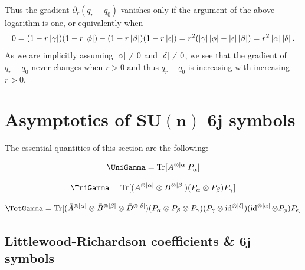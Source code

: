 \documentclass[notitlepage, 10pt]{article}
\begin{document}
Thus the gradient $\partial_{r} (q_{r}-q_{0})$ vanishes only if the argument of the above logarithm is one, or equivalently when
\begin{equation}
    0 = (1-r\left|\gamma\right|)(1-r\left|\phi\right|)-(1-r\left|\beta\right|)(1-r\left|\epsilon\right|) = r^2(\left|\gamma\right|\left|\phi\right| - \left|\epsilon\right|\left|\beta\right|) = r^2 \left|\alpha\right|\left|\delta\right|.
\end{equation}
As we are implicitly assuming $\left|\alpha\right| \neq 0$ and $\left|\delta\right| \neq 0$, we see that the gradient of $q_{r} - q_{0}$ never changes when $r>0$ and thus $q_{r}-q_{0}$ is increasing with increasing $r > 0$.


\clearpage
\section{Asymptotics of \texorpdfstring{$\boldsymbol{SU(n)}$ $\boldsymbol{6j}$}{SU(n) 6j} symbols}

The essential quantities of this section are the following:

\begin{equation}
    \UniGamma
    = \Tr[\bar A^{\ot \abs \alpha} P_{\alpha}]
\end{equation}

\begin{equation}
    \TriGamma 
    = \Tr[(\bar A^{\ot \abs \alpha} \ot \bar B^{\ot \abs \beta}) (P_{\alpha}\ot P_{\beta}) P_{\gamma}]
\end{equation}

\begin{equation}
    \TetGamma 
    = \Tr[(\bar A^{\ot \abs \alpha} \ot \bar B^{\ot \abs \beta} \ot \bar D^{\ot \abs \delta}) (P_{\alpha}\ot P_{\beta} \ot P_{\gamma}) (P_{\gamma}\ot \id^{\ot \abs{\delta}})(\id^{\ot \abs{\alpha}} \ot P_{\phi})P_{\epsilon}]
\end{equation}

\subsection{Littlewood-Richardson coefficients \& \texorpdfstring{$\boldsymbol{6j}$}{6j} symbols}
\end{document}
